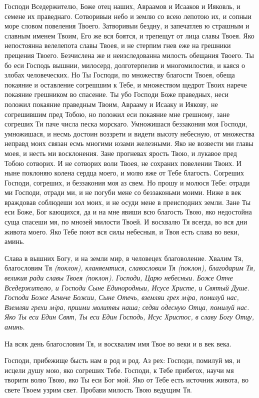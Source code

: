 Господи Вседержителю, Боже отец наших, Авраамов и Исааков и Ияковль, и семене их праведнаго. Сотворивыи небо и землю со всею лепотою их, и сопныи море словом повеления Твоего. Затворивыи бездну, и запечатлев ю страшным и славным именем Твоим, Его же вся боятся, и трепещут от лица славы Твоея. Яко непостоянна велелепота славы Твоея, и не стерпим гнев еже на грешники прещения Твоего. Безчислена же и неизследованна милость обещания Твоего. Ты бо еси Господь вышнии, милосерд, долготерпелив и многомилостив, и каяся о злобах человеческих. Но Ты Господи, по множеству благости Твоея, обеща покаяние и оставление согрешшим к Тебе, и множеством щедрот Твоих нарече покаяние грешником во спасение. Ты убо Господи Боже праведных, неси положил покаяние праведным Твоим, Аврааму и Исааку и Иякову, не согрешившим пред Тобою, но положил еси покаяние мне грешному, зане согреших Ти паче числа песка морскаго. Умножишася беззакония моя Господи, умножишася, и несмь достоин воззрети и видети высоту небесную, от множества неправд моих связан есмь многими юзами железными. Яко не возвести ми главы моея, и несть ми восклонения. Зане прогневах ярость Твою, и лукавое пред Тобою сотворих. И не сотворих воли Твоея, не сохраних повелении Твоих. И ныне поклоняю колена сердца моего, и молю яже от Тебе благость. Согреших Господи, согреших, и беззакония моя аз свем. Но прошу и молюся Тебе: отради ми Господи, отради ми, и не погуби мене со беззаконьми моими. Ниже в век враждовав соблюдеши зол моих, и не осуди мене в преисподних земли. Зане Ты еси Боже, Бог кающихся, да и на мне явиши всю благость Твою, яко недостойна суща спасеши мя, по мнозей милости Твоей. И восхвалю Тя всегда, во вся дни живота моего. Яко Тебе поют вся силы небесныя, и Твоя есть слава во веки, аминь.


Слава в вышних Богу, и на земли мир, в человецех благоволение. Хвалим Тя, благословим Тя \itshape (поклон)\normalfont{}, кланяемтися, славословим Тя \itshape (поклон)\normalfont{}, благодарим Тя, великия ради славы Твоея \itshape (поклон)\normalfont{}. Господи, Царю небесныи. Боже Отче Вседержителю, и Господи Сыне Единородныи, Исусе Христе, и Святый Душе. Господи Боже Агньче Божии, Сыне Отечь, вземляи грех мiра, помилуй нас, Вземляи грехи мiра, приими молитвы наша; седяи одесную Отца, помилуй нас. Яко Ты еси Един Свят, Ты еси Един Господь, Исус Христос, в славу Богу Отцу, аминь.


На всяк день благословим Тя, и восхвалим имя Твое во веки и в век века.


Господи, прибежище бысть нам в род и род. Аз рех: Господи, помилуй мя, и исцели душу мою, яко согреших Тебе. Господи, к Тебе прибегох, научи мя творити волю Твою, яко Ты еси Бог мой. Яко от Тебе есть источник живота, во свете Твоем узрим свет. Пробави милость Твою ведущим Тя.


